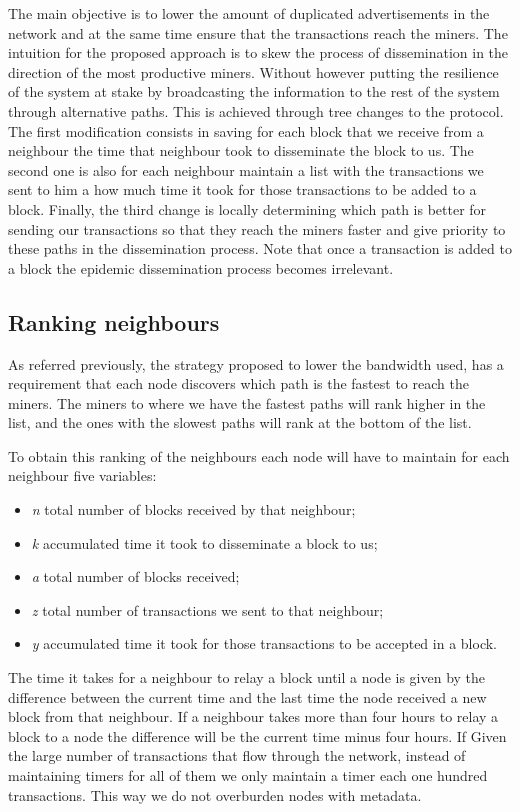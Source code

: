 \documentclass{dads}   %
\begin{document}
The main objective is to lower the amount of duplicated advertisements in the network and at the same time ensure that the transactions reach the miners. The intuition for the proposed approach is to skew the process of dissemination in the direction of the most productive miners. Without however putting the resilience of the system at stake by broadcasting the information to the rest of the system through alternative paths. This is achieved through tree changes to the protocol. The first modification consists in saving for each block that we receive from a neighbour the time that neighbour took to disseminate the block to us. The second one is also for each neighbour maintain a list with the transactions we sent to him a how much time it took for those transactions to be added to a block. Finally, the third change is locally determining which path is better for sending our transactions so that they reach the miners faster and give priority to these paths in the dissemination process. Note that once a transaction is added to a block the epidemic dissemination process becomes irrelevant.

\subsection{Ranking neighbours}
As referred previously, the strategy proposed to lower the bandwidth used, has a requirement that each node discovers which path is the fastest to reach the miners. The miners to where we have the fastest paths will rank higher in the list, and the ones with the slowest paths will rank at the bottom of the list.

To obtain this ranking of the neighbours each node will have to maintain for each neighbour five variables:
\begin{itemize}
  \item \textit{n} total number of blocks received by that neighbour;
  \item \textit{k} accumulated time it took to disseminate a block to us;
  \item \textit{a} total number of blocks received;
  \item \textit{z} total number of transactions we sent to that neighbour;
  \item \textit{y} accumulated time it took for those transactions to be accepted in a block.
\end{itemize}

The time it takes for a neighbour to relay a block until a node is given by the difference between the current time and the last time the node received a new block from that neighbour. If a neighbour takes more than four hours to relay a block to a node the difference will be the current time minus four hours.  If Given the large number of transactions that flow through the network, instead of maintaining timers for all of them we only maintain a timer each one hundred transactions. This way we do not overburden nodes with metadata.
\end{document}
